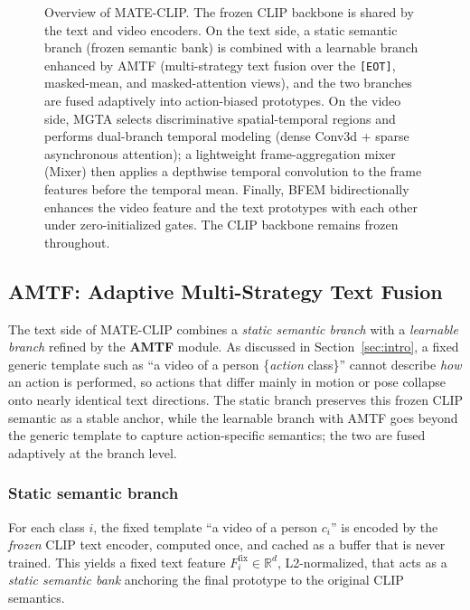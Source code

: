\begin{figure}[t]
  \centering
  \fbox{\rule{0pt}{2.2in} \rule{0.9\linewidth}{0pt}}
  \caption{Overview of MATE-CLIP.
  The frozen CLIP backbone is shared by the text and video encoders.
  On the text side, a static semantic branch (frozen semantic bank) is combined with a learnable branch enhanced by AMTF (multi-strategy text fusion over the \texttt{[EOT]}, masked-mean, and masked-attention views), and the two branches are fused adaptively into action-biased prototypes.
  On the video side, MGTA selects discriminative spatial-temporal regions and performs dual-branch temporal modeling (dense Conv3d + sparse asynchronous attention); a lightweight frame-aggregation mixer (Mixer) then applies a depthwise temporal convolution to the frame features before the temporal mean.
  Finally, BFEM bidirectionally enhances the video feature and the text prototypes with each other under zero-initialized gates.
  The CLIP backbone remains frozen throughout.}
  \label{fig:overview}
\end{figure}

\subsection{AMTF: Adaptive Multi-Strategy Text Fusion}
\label{sec:amtf}
The text side of MATE-CLIP combines a \emph{static semantic branch} with a \emph{learnable branch} refined by the \textbf{AMTF} module.
As discussed in Section~\ref{sec:intro}, a fixed generic template such as ``a video of a person \{\emph{action} class\}'' cannot describe \emph{how} an action is performed, so actions that differ mainly in motion or pose collapse onto nearly identical text directions.
The static branch preserves this frozen CLIP semantic as a stable anchor, while the learnable branch with AMTF goes beyond the generic template to capture action-specific semantics; the two are fused adaptively at the branch level.

\subsubsection{Static semantic branch}
For each class $i$, the fixed template ``a video of a person $c_i$'' is encoded by the \emph{frozen} CLIP text encoder, computed once, and cached as a buffer that is never trained.
This yields a fixed text feature $F^{\text{fix}}_i \in \mathbb{R}^{d}$, L2-normalized, that acts as a \emph{static semantic bank} anchoring the final prototype to the original CLIP semantics.

